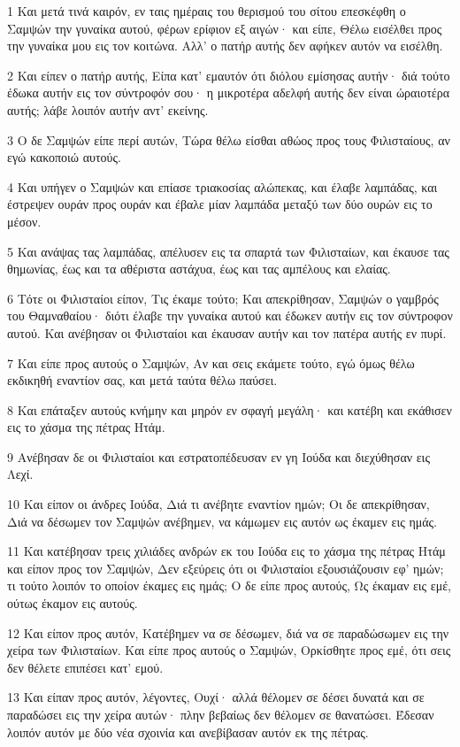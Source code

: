 \par 1 Και μετά τινά καιρόν, εν ταις ημέραις του θερισμού του σίτου επεσκέφθη ο Σαμψών την γυναίκα αυτού, φέρων ερίφιον εξ αιγών· και είπε, Θέλω εισέλθει προς την γυναίκα μου εις τον κοιτώνα. Αλλ' ο πατήρ αυτής δεν αφήκεν αυτόν να εισέλθη.
\par 2 Και είπεν ο πατήρ αυτής, Είπα κατ' εμαυτόν ότι διόλου εμίσησας αυτήν· διά τούτο έδωκα αυτήν εις τον σύντροφόν σου· η μικροτέρα αδελφή αυτής δεν είναι ώραιοτέρα αυτής; λάβε λοιπόν αυτήν αντ' εκείνης.
\par 3 Ο δε Σαμψών είπε περί αυτών, Τώρα θέλω είσθαι αθώος προς τους Φιλισταίους, αν εγώ κακοποιώ αυτούς.
\par 4 Και υπήγεν ο Σαμψών και επίασε τριακοσίας αλώπεκας, και έλαβε λαμπάδας, και έστρεψεν ουράν προς ουράν και έβαλε μίαν λαμπάδα μεταξύ των δύο ουρών εις το μέσον.
\par 5 Και ανάψας τας λαμπάδας, απέλυσεν εις τα σπαρτά των Φιλισταίων, και έκαυσε τας θημωνίας, έως και τα αθέριστα αστάχυα, έως και τας αμπέλους και ελαίας.
\par 6 Τότε οι Φιλισταίοι είπον, Τις έκαμε τούτο; Και απεκρίθησαν, Σαμψών ο γαμβρός του Θαμναθαίου· διότι έλαβε την γυναίκα αυτού και έδωκεν αυτήν εις τον σύντροφον αυτού. Και ανέβησαν οι Φιλισταίοι και έκαυσαν αυτήν και τον πατέρα αυτής εν πυρί.
\par 7 Και είπε προς αυτούς ο Σαμψών, Αν και σεις εκάμετε τούτο, εγώ όμως θέλω εκδικηθή εναντίον σας, και μετά ταύτα θέλω παύσει.
\par 8 Και επάταξεν αυτούς κνήμην και μηρόν εν σφαγή μεγάλη· και κατέβη και εκάθισεν εις το χάσμα της πέτρας Ητάμ.
\par 9 Ανέβησαν δε οι Φιλισταίοι και εστρατοπέδευσαν εν γη Ιούδα και διεχύθησαν εις Λεχί.
\par 10 Και είπον οι άνδρες Ιούδα, Διά τι ανέβητε εναντίον ημών; Οι δε απεκρίθησαν, Διά να δέσωμεν τον Σαμψών ανέβημεν, να κάμωμεν εις αυτόν ως έκαμεν εις ημάς.
\par 11 Και κατέβησαν τρεις χιλιάδες ανδρών εκ του Ιούδα εις το χάσμα της πέτρας Ητάμ και είπον προς τον Σαμψών, Δεν εξεύρεις ότι οι Φιλισταίοι εξουσιάζουσιν εφ' ημών; τι τούτο λοιπόν το οποίον έκαμες εις ημάς; Ο δε είπε προς αυτούς, Ως έκαμαν εις εμέ, ούτως έκαμον εις αυτούς.
\par 12 Και είπον προς αυτόν, Κατέβημεν να σε δέσωμεν, διά να σε παραδώσωμεν εις την χείρα των Φιλισταίων. Και είπε προς αυτούς ο Σαμψών, Ορκίσθητε προς εμέ, ότι σεις δεν θέλετε επιπέσει κατ' εμού.
\par 13 Και είπαν προς αυτόν, λέγοντες, Ουχί· αλλά θέλομεν σε δέσει δυνατά και σε παραδώσει εις την χείρα αυτών· πλην βεβαίως δεν θέλομεν σε θανατώσει. Έδεσαν λοιπόν αυτόν με δύο νέα σχοινία και ανεβίβασαν αυτόν εκ της πέτρας.

